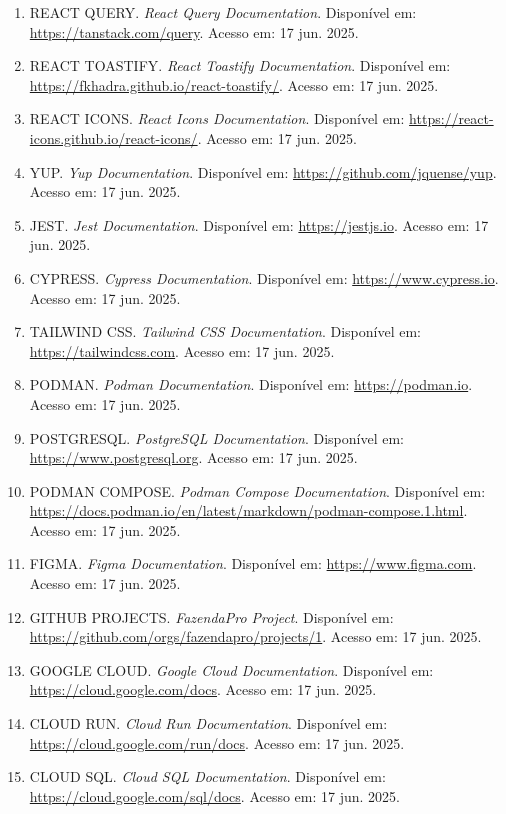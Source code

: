 \documentclass[12pt, a4paper]{article}
\begin{document}
\begin{spacing}{1.5}
\begin{spacing}{1.5}
\begin{spacing}{1.5}
\begin{enumerate}
    \item REACT QUERY. \textit{React Query Documentation}. Disponível em: \url{https://tanstack.com/query}. Acesso em: 17 jun. 2025.
    \item REACT TOASTIFY. \textit{React Toastify Documentation}. Disponível em: \url{https://fkhadra.github.io/react-toastify/}. Acesso em: 17 jun. 2025.
    \item REACT ICONS. \textit{React Icons Documentation}. Disponível em: \url{https://react-icons.github.io/react-icons/}. Acesso em: 17 jun. 2025.
    \item YUP. \textit{Yup Documentation}. Disponível em: \url{https://github.com/jquense/yup}. Acesso em: 17 jun. 2025.
    \item JEST. \textit{Jest Documentation}. Disponível em: \url{https://jestjs.io}. Acesso em: 17 jun. 2025.
    \item CYPRESS. \textit{Cypress Documentation}. Disponível em: \url{https://www.cypress.io}. Acesso em: 17 jun. 2025.
    \item TAILWIND CSS. \textit{Tailwind CSS Documentation}. Disponível em: \url{https://tailwindcss.com}. Acesso em: 17 jun. 2025.
    \item PODMAN. \textit{Podman Documentation}. Disponível em: \url{https://podman.io}. Acesso em: 17 jun. 2025.
    \item POSTGRESQL. \textit{PostgreSQL Documentation}. Disponível em: \url{https://www.postgresql.org}. Acesso em: 17 jun. 2025.
    \item PODMAN COMPOSE. \textit{Podman Compose Documentation}. Disponível em: \url{https://docs.podman.io/en/latest/markdown/podman-compose.1.html}. Acesso em: 17 jun. 2025.
    \item FIGMA. \textit{Figma Documentation}. Disponível em: \url{https://www.figma.com}. Acesso em: 17 jun. 2025.
    \item GITHUB PROJECTS. \textit{FazendaPro Project}. Disponível em: \url{https://github.com/orgs/fazendapro/projects/1}. Acesso em: 17 jun. 2025.
    \item GOOGLE CLOUD. \textit{Google Cloud Documentation}. Disponível em: \url{https://cloud.google.com/docs}. Acesso em: 17 jun. 2025.
    \item CLOUD RUN. \textit{Cloud Run Documentation}. Disponível em: \url{https://cloud.google.com/run/docs}. Acesso em: 17 jun. 2025.
    \item CLOUD SQL. \textit{Cloud SQL Documentation}. Disponível em: \url{https://cloud.google.com/sql/docs}. Acesso em: 17 jun. 2025.

\end{enumerate}
\end{spacing}
\end{spacing}
\end{spacing}
\end{document}
